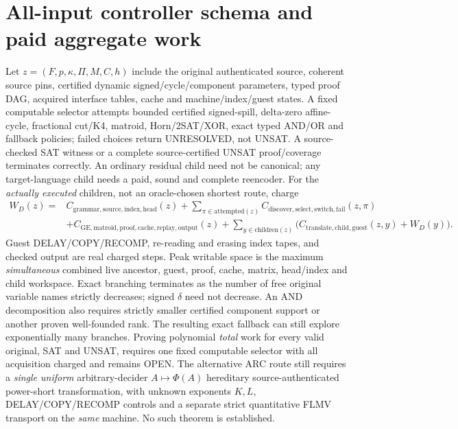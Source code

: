 \documentclass[11pt]{article}
\begin{document}
\section{All-input controller schema and paid aggregate work}
Let $z=(F,p,\kappa,\Pi,M,C,h)$ include the original authenticated source, coherent source pins, certified dynamic signed/cycle/component parameters, typed proof DAG, acquired interface tables, cache and machine/index/guest states. A fixed computable selector attempts bounded certified signed-spill, delta-zero affine-cycle, fractional cut/K4, matroid, Horn/2SAT/XOR, exact typed AND/OR and fallback policies; failed choices return UNRESOLVED, not UNSAT. A source-checked SAT witness or a complete source-certified UNSAT proof/coverage terminates correctly. An ordinary residual child need not be canonical; any target-language child needs a paid, sound and complete reencoder.
For the \emph{actually executed} children, not an oracle-chosen shortest route, charge
\[
\begin{aligned}
W_D(z)={}&C_{\mathrm{grammar,source,index,head}}(z)
+\sum_{\pi\in\mathrm{attempted}(z)}C_{\mathrm{discover,select,switch,fail}}(z,\pi)\\
&+C_{\mathrm{GE,matroid,proof,cache,replay,output}}(z)
+\sum_{y\in\mathrm{children}(z)}\big(C_{\mathrm{translate,child,guest}}(z,y)+W_D(y)\big).
\tag{3}
\end{aligned}
\]
Guest DELAY/COPY/RECOMP, re-reading and erasing index tapes, and checked output are real charged steps. Peak writable space is the maximum \emph{simultaneous} combined live ancestor, guest, proof, cache, matrix, head/index and child workspace. Exact branching terminates as the number of free original variable names strictly decreases; signed $\delta$ need not decrease. An AND decomposition also requires strictly smaller certified component support or another proven well-founded rank. The resulting exact fallback can still explore exponentially many branches. Proving polynomial \emph{total} work for every valid original, SAT and UNSAT, requires one fixed computable selector with all acquisition charged and remains OPEN.
The alternative ARC route still requires a \emph{single uniform} arbitrary-decider $A\mapsto\Phi(A)$ hereditary source-authenticated power-short transformation, with unknown exponents $K,L$, DELAY/COPY/RECOMP controls and a separate strict quantitative FLMV transport on the \emph{same} machine. No such theorem is established.
\end{document}
